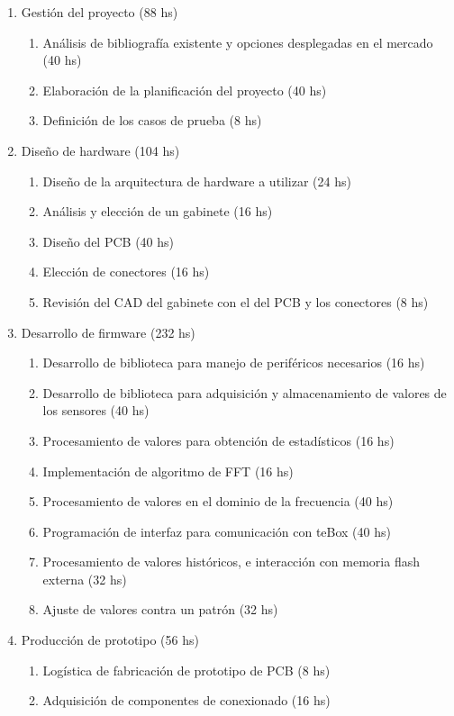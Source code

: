 \documentclass[11pt]{charter}
\begin{document}
\begin{enumerate}
\item Gestión del proyecto (88 hs)
	\begin{enumerate}
	\item Análisis de bibliografía existente y opciones desplegadas en el mercado (40 hs)
	\item Elaboración de la planificación del proyecto (40 hs)
	\item Definición de los casos de prueba (8 hs)
	\end{enumerate}
\item Diseño de hardware (104 hs)
	\begin{enumerate}
	\item Diseño de la arquitectura de hardware a utilizar (24 hs)
	\item Análisis y elección de un gabinete (16 hs)
	\item Diseño del PCB (40 hs)
	\item Elección de conectores (16 hs)
	\item Revisión del CAD del gabinete con el del PCB y los conectores (8 hs)
	\end{enumerate}
\item Desarrollo de firmware (232 hs)
	\begin{enumerate}
	\item Desarrollo de biblioteca para manejo de periféricos necesarios (16 hs)
	\item Desarrollo de biblioteca para adquisición y almacenamiento de valores de los sensores (40 hs)
	\item Procesamiento de valores para obtención de estadísticos (16 hs)
	\item Implementación de algoritmo de FFT (16 hs)
	\item Procesamiento de valores en el dominio de la frecuencia (40 hs)
	\item Programación de interfaz para comunicación con teBox (40 hs)
	\item Procesamiento de valores históricos, e interacción con memoria flash externa (32 hs)
	\item Ajuste de valores contra un patrón (32 hs)
	\end{enumerate}
\item Producción de prototipo (56 hs)
	\begin{enumerate}
	\item Logística de fabricación de prototipo de PCB (8 hs)
	\item Adquisición de componentes de conexionado (16 hs)

\end{enumerate}
\end{enumerate}
\end{document}
